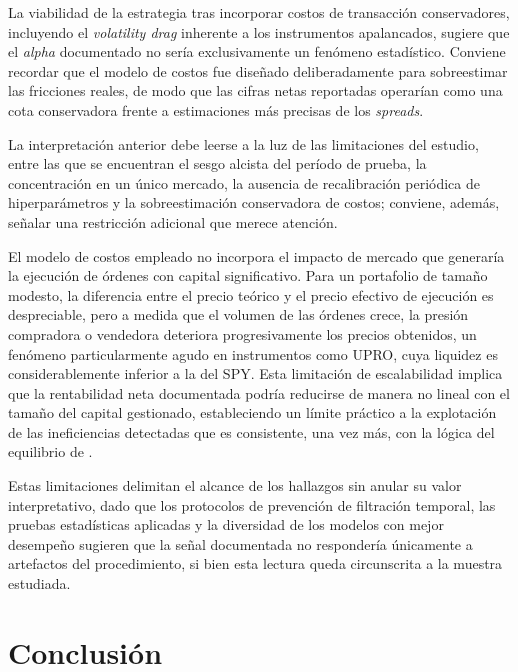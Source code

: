 ﻿\documentclass[11pt,a4paper]{article}
\begin{document}
La viabilidad de la estrategia tras incorporar costos de transacci\'on conservadores, incluyendo el \textit{volatility drag} inherente a los instrumentos apalancados, sugiere que el \textit{alpha} documentado no ser\'ia exclusivamente un fen\'omeno estad\'istico. Conviene recordar que el modelo de costos fue dise\~nado deliberadamente para sobreestimar las fricciones reales, de modo que las cifras netas reportadas operar\'ian como una cota conservadora frente a estimaciones m\'as precisas de los \textit{spreads}.

La interpretaci\'on anterior debe leerse a la luz de las limitaciones del estudio, entre las que se encuentran el sesgo alcista del per\'iodo de prueba, la concentraci\'on en un \'unico mercado, la ausencia de recalibraci\'on peri\'odica de hiperpar\'ametros y la sobreestimaci\'on conservadora de costos; conviene, adem\'as, se\~nalar una restricci\'on adicional que merece atenci\'on.

El modelo de costos empleado no incorpora el impacto de mercado que generar\'ia la ejecuci\'on de \'ordenes con capital significativo. Para un portafolio de tama\~no modesto, la diferencia entre el precio te\'orico y el precio efectivo de ejecuci\'on es despreciable, pero a medida que el volumen de las \'ordenes crece, la presi\'on compradora o vendedora deteriora progresivamente los precios obtenidos, un fen\'omeno particularmente agudo en instrumentos como UPRO, cuya liquidez es considerablemente inferior a la del SPY. Esta limitaci\'on de escalabilidad implica que la rentabilidad neta documentada podr\'ia reducirse de manera no lineal con el tama\~no del capital gestionado, estableciendo un l\'imite pr\'actico a la explotaci\'on de las ineficiencias detectadas que es consistente, una vez m\'as, con la l\'ogica del equilibrio de \citet{grossman1980}.

Estas limitaciones delimitan el alcance de los hallazgos sin anular su valor interpretativo, dado que los protocolos de prevenci\'on de filtraci\'on temporal, las pruebas estad\'isticas aplicadas y la diversidad de los modelos con mejor desempe\~no sugieren que la se\~nal documentada no responder\'ia \'unicamente a artefactos del procedimiento, si bien esta lectura queda circunscrita a la muestra estudiada.

\section{Conclusi\'on}
\end{document}
